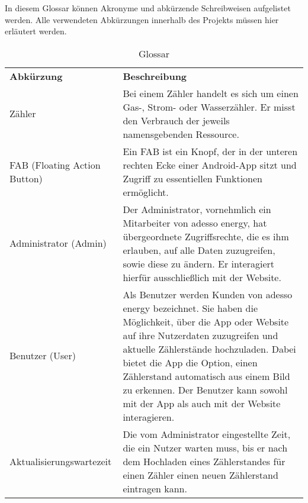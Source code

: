 \begin{tcolorbox}
	In diesem Glossar können Akronyme und abkürzende Schreibweisen aufgelistet werden. 
	Alle verwendeten Abkürzungen innerhalb des Projekts müssen hier erläutert werden.
\end{tcolorbox}

\begin{table}[h]
	\centering
	\begin{tabularx}{\textwidth}{X X}
		\rowcolor[HTML]{C0C0C0} 
		\textbf{Abkürzung} & \textbf{Beschreibung} \\
		Zähler & Bei einem Zähler handelt es sich um einen Gas-, Strom- oder Wasserzähler. Er misst den Verbrauch der jeweils namensgebenden Ressource. \\
		\rowcolor[HTML]{E7E7E7} 
		FAB (Floating Action Button) & Ein FAB ist ein Knopf, der in der unteren rechten Ecke einer Android-App sitzt und Zugriff zu essentiellen Funktionen ermöglicht. \\
		Administrator (Admin) & Der Administrator, vornehmlich ein Mitarbeiter von adesso energy, hat übergeordnete Zugriffsrechte, die es ihm erlauben, auf alle Daten zuzugreifen, sowie diese zu ändern. Er interagiert hierfür ausschließlich mit der Website. \\
		\rowcolor[HTML]{E7E7E7} 
		Benutzer (User) & Als Benutzer werden Kunden von adesso energy bezeichnet. Sie haben die Möglichkeit, über die App oder Website auf ihre Nutzerdaten zuzugreifen und aktuelle Zählerstände hochzuladen. Dabei bietet die App die Option, einen Zählerstand automatisch aus einem Bild zu erkennen. Der Benutzer kann sowohl mit der App als auch mit der Website interagieren. \\
		Aktualisierungswartezeit & Die vom Administrator eingestellte Zeit, die ein Nutzer warten muss, bis er nach dem Hochladen eines Zählerstandes für einen Zähler einen neuen Zählerstand eintragen kann. 
	\end{tabularx}
	\caption{Glossar}
	\label{table:glossar}
\end{table}
